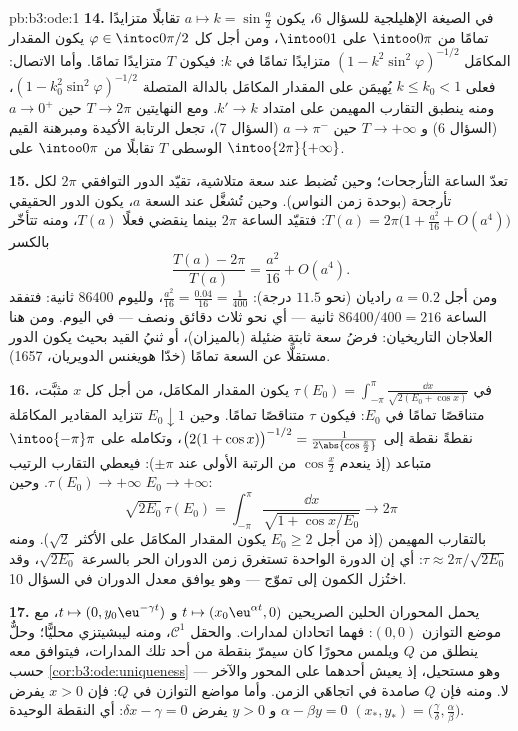 \begin{solution}{pb:b3:ode:1}
\textbf{14.} في الصيغة الإهليلجية للسؤال 6، يكون $a \mapsto
k = \sin\frac a2$ تقابلًا
 متزايدًا تمامًا من $\intoo0\pi$ على $\intoo01$، ومن أجل
كل $\varphi \in \intoc0{\pi/2}$ يكون المقدار المكامَل $(1 -
k^2\sin^2\varphi)^{-1/2}$ متزايدًا تمامًا في
$k$: فيكون $T$ متزايدًا تمامًا. وأما الاتصال: فعلى $k \leq k_0 < 1$
يُهيمَن على المقدار المكامَل بالدالة المتصلة $(1 -
k_0^2\sin^2\varphi)^{-1/2}$، ومنه
ينطبق التقارب المهيمن على امتداد $k' \to k$. ومع النهايتين
$T \to 2\pi$ حين $a
\to 0^+$ (السؤال 6) و $T \to +\infty$ حين
$a \to \pi^-$ (السؤال 7)، تجعل الرتابة الأكيدة ومبرهنة القيم
الوسطى $T$ تقابلًا من $\intoo0\pi$ على $\intoo{2\pi}{+\infty}$.

\textbf{15.} تعدّ الساعة التأرجحات؛ وحين تُضبط عند سعة متلاشية،
تقيّد الدور التوافقي $2\pi$ لكل تأرجحة (بوحدة زمن النواس). وحين
تُشغَّل عند السعة $a$، يكون الدور الحقيقي $T(a) = 2\pi\bigl(1 + \frac{a^2}{16} +
O(a^4)\bigr)$: فتقيّد
الساعة $2\pi$ بينما ينقضي فعلًا $T(a)$، ومنه تتأخّر بالكسر
\[
\frac{T(a) - 2\pi}{T(a)} = \frac{a^2}{16} + O(a^4) .
\]
ومن أجل $a = 0.2$ راديان (نحو $11.5$ درجة): $\frac{a^2}{16} =
\frac{0.04}{16} = \frac1{400}$، ولليوم
$86400$ ثانية: فتفقد الساعة $86400/400 = 216$ ثانية --- أي نحو ثلاث دقائق
ونصف --- في اليوم. ومن هنا العلاجان التاريخيان: فرضُ سعة ثابتة
ضئيلة (بالميزان)، أو ثنيُ القيد بحيث يكون الدور مستقلًّا عن
السعة تمامًا (خدّا هويغنس الدويريان، 1657).

\textbf{16.} في $\tau(E_0) = \int_{-\pi}^{\pi}\frac{\dd
x}{\sqrt{2(E_0 + \cos x)}}$ يكون المقدار المكامَل، من أجل كل $x$
مثبَّت، متناقصًا تمامًا في $E_0$: فيكون $\tau$ متناقصًا تمامًا.
وحين $E_0 \downarrow 1$ تتزايد المقادير المكامَلة نقطةً نقطة إلى $\bigl(2(1 + \cos x)\bigr)^{-1/2} =
\frac1{2\abs{\cos\frac x2}}$،
وتكامله على $\intoo{-\pi}\pi$ متباعد (إذ ينعدم $\cos\frac x2$ من الرتبة
الأولى عند $\pm\pi$): فيعطي التقارب الرتيب $\tau(E_0)
\to +\infty$. وحين $E_0 \to +\infty$:
\[
\sqrt{2E_0}\,\tau(E_0) = \int_{-\pi}^{\pi}
\frac{\dd x}{\sqrt{1 + \cos x/E_0}} \longrightarrow 2\pi
\]
بالتقارب المهيمن (إذ من أجل $E_0 \geq 2$ يكون المقدار المكامَل
على الأكثر $\sqrt2$). ومنه $\tau \approx 2\pi/\sqrt{2E_0}$: أي إن الدورة الواحدة
تستغرق زمن الدوران الحر بالسرعة $\sqrt{2E_0}$، وقد اختُزل
الكمون إلى تموّج --- وهو يوافق معدل الدوران في السؤال 10.

\textbf{17.} يحمل المحوران الحلين الصريحين $t
\mapsto (x_0\eu^{\alpha t}, 0)$ و $t \mapsto (0,
y_0\eu^{-\gamma t})$،
مع موضع التوازن $(0, 0)$: فهما اتحادان لمدارات. والحقل $\mathcal
C^1$،
ومنه ليبشيتزي محليًّا؛ وحلٌّ ينطلق من $Q$ ويلمس محورًا كان
سيمرّ بنقطة من أحد تلك المدارات، فيتوافق معه حسب \cref{cor:b3:ode:uniqueness}
--- وهو مستحيل، إذ يعيش أحدهما على المحور والآخر لا. ومنه فإن
$Q$ صامدة في اتجاهَي الزمن. وأما مواضع التوازن في $Q$: فإن
$x > 0$ يفرض $\alpha - \beta y = 0$ و $y > 0$ يفرض $\delta x - \gamma = 0$: أي النقطة الوحيدة
$(x_*, y_*) = \bigl(\frac\gamma\delta,
\frac\alpha\beta\bigr)$.


\end{solution}
